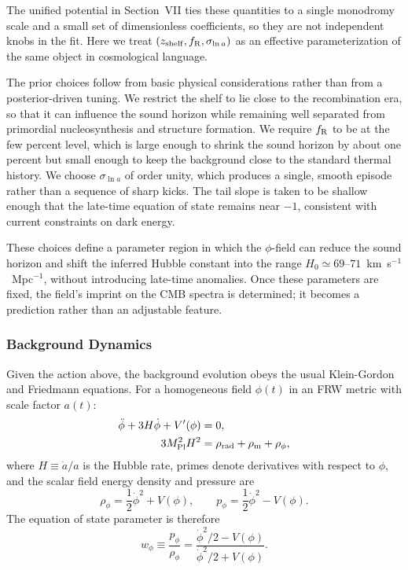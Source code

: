 \documentclass[a4paper,11pt]{article}
\begin{document}
The unified potential in Section~VII ties these quantities to a single monodromy scale and a small set of dimensionless coefficients, so they are not independent knobs in the fit. Here we treat $(z_{\rm shelf}, f_{\rm R}, \sigma_{\ln a})$ as an effective parameterization of the same object in cosmological language.

The prior choices follow from basic physical considerations rather than from a posterior-driven tuning. We restrict the shelf to lie close to the recombination era, so that it can influence the sound horizon while remaining well separated from primordial nucleosynthesis and structure formation. We require $f_{\rm R}$ to be at the few percent level, which is large enough to shrink the sound horizon by about one percent but small enough to keep the background close to the standard thermal history. We choose $\sigma_{\ln a}$ of order unity, which produces a single, smooth episode rather than a sequence of sharp kicks. The tail slope is taken to be shallow enough that the late-time equation of state remains near $-1$, consistent with current constraints on dark energy.

These choices define a parameter region in which the $\phi$-field can reduce the sound horizon and shift the inferred Hubble constant into the range $H_{0} \simeq 69$--$71$~km~s$^{-1}$~Mpc$^{-1}$, without introducing late-time anomalies. Once these parameters are fixed, the field's imprint on the CMB spectra is determined; it becomes a prediction rather than an adjustable feature.

\subsubsection{Background Dynamics}
\label{sec:background}

Given the action above, the background evolution obeys the usual Klein-Gordon and Friedmann equations. For a homogeneous field $\phi(t)$ in an FRW metric with scale factor $a(t)$:
\begin{align}
\ddot{\phi} + 3 H \dot{\phi} + V'(\phi) &= 0, \label{eq:klein_gordon}\\
3 M_{\rm Pl}^2 H^2 &= \rho_{\rm rad} + \rho_{\rm m} + \rho_{\phi}, \label{eq:friedmann}
\end{align}
where $H \equiv \dot{a}/a$ is the Hubble rate, primes denote derivatives with respect to $\phi$, and the scalar field energy density and pressure are
\begin{equation}
\rho_{\phi} = \frac{1}{2}\dot{\phi}^2 + V(\phi), \qquad p_{\phi} = \frac{1}{2}\dot{\phi}^2 - V(\phi).
\label{eq:rho_p}
\end{equation}
The equation of state parameter is therefore
\begin{equation}
w_\phi \equiv \frac{p_\phi}{\rho_\phi} = \frac{\dot{\phi}^2/2 - V(\phi)}{\dot{\phi}^2/2 + V(\phi)}.
\label{eq:eos}
\end{equation}
\end{document}
